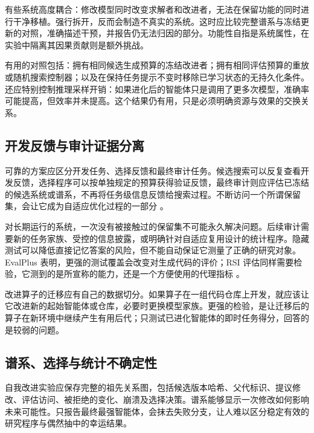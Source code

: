 \documentclass[11pt,,]{article}
\begin{document}
有些系统高度耦合：修改模型同时改变求解者和改进者，无法在保留功能的同时进行干净移植。强行拆开，反而会制造不真实的系统。这时应比较完整谱系与冻结更新的对照，准确描述干预，并报告仍无法归因的部分。功能性自指是系统属性，在实验中隔离其因果贡献则是额外挑战。

有用的对照包括：拥有相同候选生成预算的冻结改进者；拥有相同评估预算的重放或随机搜索控制器；以及在保持任务提示不变时移除已学习状态的无持久化条件。还应特别控制推理采样开销：如果进化后的智能体只是调用了更多次模型，准确率可能提高，但效率并未提高。这个结果仍有用，只是必须明确资源与效果的交换关系。

\hypertarget{ux5f00ux53d1ux53cdux9988ux4e0eux5ba1ux8ba1ux8bc1ux636eux5206ux79bb}{%
\subsection{开发反馈与审计证据分离}\label{ux5f00ux53d1ux53cdux9988ux4e0eux5ba1ux8ba1ux8bc1ux636eux5206ux79bb}}

可靠的方案应区分开发任务、选择反馈和最终审计任务。候选搜索可以反复查看开发反馈，选择程序可以按单独规定的预算获得验证反馈，最终审计则应评估已冻结的候选系统或谱系，不再将任务级信息反馈给搜索过程。不断访问一个所谓保留集，会让它成为自适应优化过程的一部分
\citep{adaptive2015}。

对长期运行的系统，一次没有被接触过的保留集不可能永久解决问题。后续审计需要新的任务家族、受控的信息披露，或明确针对自适应复用设计的统计程序。隐藏测试可以降低直接记忆答案的风险，但不能自动保证它测量了正确的研究对象。EvalPlus
表明，更强的测试覆盖会改变对生成代码的评价；RSI
评估同样需要检验，它测到的是所宣称的能力，还是一个方便使用的代理指标
\citep{evalplus2023}。

改进算子的迁移应有自己的数据切分。如果算子在一组代码仓库上开发，就应该让它改进新的起始智能体或仓库，必要时更换模型家族。更强的检验，是让迁移后的算子在新环境中继续产生有用后代；只测试已进化智能体的即时任务得分，回答的是较弱的问题。

\hypertarget{ux8c31ux7cfbux9009ux62e9ux4e0eux7edfux8ba1ux4e0dux786eux5b9aux6027}{%
\subsection{谱系、选择与统计不确定性}\label{ux8c31ux7cfbux9009ux62e9ux4e0eux7edfux8ba1ux4e0dux786eux5b9aux6027}}

自我改进实验应保存完整的祖先关系图，包括候选版本哈希、父代标识、提议修改、评估访问、被拒绝的变化、崩溃及选择决策。谱系能够显示一次修改如何影响未来可能性。只报告最终最强智能体，会抹去失败分支，让人难以区分稳定有效的研究程序与偶然抽中的幸运结果。
\end{document}
